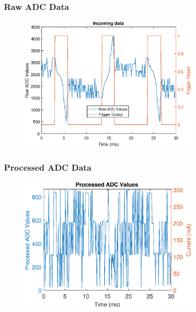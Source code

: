 \documentclass{beamer}
\begin{document}
	\begin{frame}\frametitle{Raw ADC Data}

		\begin{figure}
			\centering
			\includegraphics[width=0.8\textwidth]{ac-raw-data.eps}
		\end{figure}

	\end{frame}

	\begin{frame}\frametitle{Processed ADC Data}

		\begin{figure}
			\centering
			\includegraphics[width=0.8\textwidth]{../chapters/evaluation-chapters/hardware/ac/processed-ac-testbed-adc-data.eps}
		\end{figure}

	\end{frame}
\end{document}

